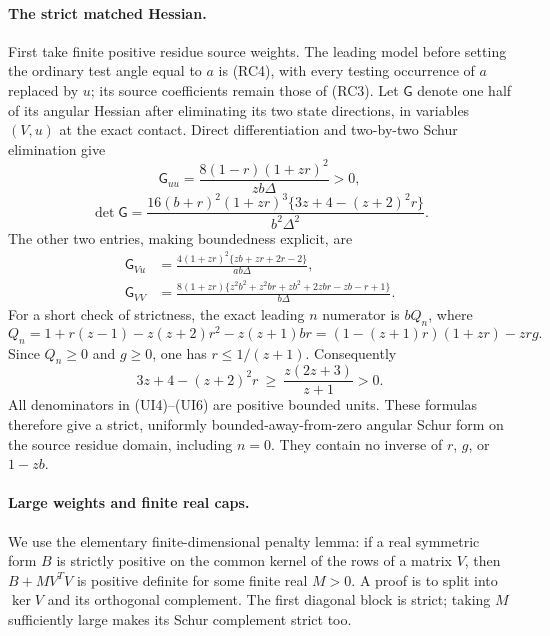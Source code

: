\paragraph{The strict matched Hessian.}
First take finite positive residue source weights. The leading model
before setting the ordinary test angle equal to $a$ is (RC4), with
every testing occurrence of $a$ replaced by $u$; its source
coefficients remain those of (RC3). Let $\mathsf G$ denote one half
of its angular Hessian after eliminating its two state directions,
in variables $(V,u)$ at the exact contact. Direct differentiation and
two-by-two Schur elimination give
\[
 \mathsf G_{uu}=
 \frac{8(1-r)(1+zr)^2}{zb\Delta}>0,                 \tag{UI4}
\]
\[
 \det\mathsf G=
 \frac{16(b+r)^2(1+zr)^3
                \{3z+4-(z+2)^2r\}}{b^2\Delta^2}.  \tag{UI5}
\]
The other two entries, making boundedness explicit, are
\begin{align*}
 \mathsf G_{Vu}&=
 \frac{4(1+zr)^2\{zb+zr+2r-2\}}{ab\Delta},\\
 \mathsf G_{VV}&=
 \frac{8(1+zr)\{z^2b^2+z^2br+zb^2+2zbr-zb-r+1\}}
      {b\Delta}.
\end{align*}
For a short check of strictness, the exact leading $n$ numerator is
$bQ_n$, where
\[
 Q_n=1+r(z-1)-z(z+2)r^2-z(z+1)br
     =(1-(z+1)r)(1+zr)-zr g.
\]
Since $Q_n\ge0$ and $g\ge0$, one has $r\le1/(z+1)$.
Consequently
\[
 3z+4-(z+2)^2r\ \ge\ \frac{z(2z+3)}{z+1}>0.       \tag{UI6}
\]
All denominators in (UI4)--(UI6) are positive bounded units.
These formulas therefore give a strict, uniformly bounded-away-from-zero
angular Schur form on the source residue domain, including $n=0$.
They contain no inverse of $r$, $g$, or $1-zb$.

\paragraph{Large weights and finite real caps.}
We use the elementary finite-dimensional penalty lemma: if a real
symmetric form $B$ is strictly positive on the common kernel of the
rows of a matrix $V$, then $B+M V^TV$ is positive definite for some
finite real $M>0$. A proof is to split into $\ker V$ and its
orthogonal complement. The first diagonal block is strict; taking
$M$ sufficiently large makes its Schur complement strict too.

